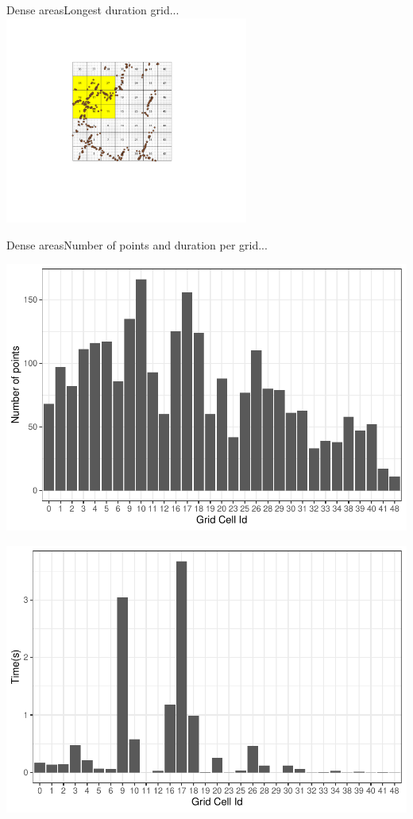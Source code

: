 \documentclass{beamer}
\begin{document}
\begin{frame}{Dense areas}{Longest duration grid...}
    \centering
    \includegraphics[trim={300 300 300 210}, clip, width=0.6\textwidth]{figures/cell518_grid17}
\end{frame}

\begin{frame}{Dense areas}{Number of points and duration per grid...}
        \centering
        \begin{minipage}{0.49\textwidth}
                \includegraphics[width=\textwidth]{figures/hoods518_n}
        \end{minipage}
        \begin{minipage}{0.49\textwidth}
                \includegraphics[width=\textwidth]{figures/hoods518_time}
        \end{minipage}
\end{frame}
\end{document}
